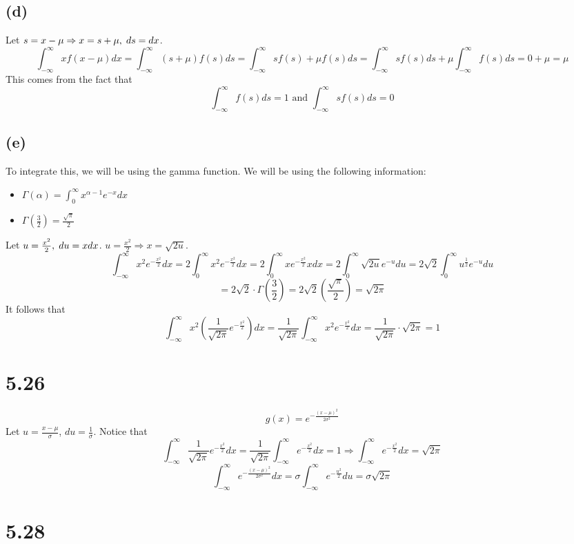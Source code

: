 \documentclass[11pt]{article}
\begin{document}
\subsection*{(d)}
Let $s=x-\mu\Rightarrow x=s+\mu,\hspace{1mm}ds=dx$.
\[\int_{-\infty}^{\infty}xf(x-\mu)dx=\int_{-\infty}^{\infty}(s+\mu)f(s)ds=\int_{-\infty}^{\infty}sf(s)+\mu f(s)ds=\int_{-\infty}^{\infty}sf(s)ds+\mu\int_{-\infty}^{\infty}f(s)ds=0+\mu=\mu\]
This comes from the fact that
\[\int_{-\infty}^{\infty}f(s)ds=1\text{ and }\int_{-\infty}^{\infty}sf(s)ds=0\]
\subsection*{(e)}
To integrate this, we will be using the gamma function. We will be using the following information:
\begin{itemize}
	\item $\Gamma(\alpha)=\int_0^{\infty}x^{\alpha-1}e^{-x}dx$
	\item $\Gamma(\frac{3}{2})=\frac{\sqrt{\pi}}{2}$
\end{itemize}
Let $u=\frac{x^2}{2},\hspace{1mm}du=xdx$. $u=\frac{x^2}{2}\Rightarrow x=\sqrt{2u}$.
\[\int_{-\infty}^{\infty}x^2e^{-\frac{x^2}{2}}dx=2\int_0^{\infty}x^2e^{-\frac{x^2}{2}}dx=2\int_0^{\infty}xe^{-\frac{x^2}{2}}xdx=2\int_0^{\infty}\sqrt{2u}e^{-u}du=2\sqrt{2}\int_0^{\infty}u^{\frac{1}{2}}e^{-u}du\]
\[=2\sqrt{2}\cdot\Gamma\left(\frac{3}{2}\right)=2\sqrt{2}\left(\frac{\sqrt{\pi}}{2}\right)=\sqrt{2\pi}\]
It follows that
\[\int_{-\infty}^{\infty}x^2\left(\frac{1}{\sqrt{2\pi}}e^{-\frac{x^2}{2}}\right)dx=\frac{1}{\sqrt{2\pi}}\int_{-\infty}^{\infty}x^2e^{-\frac{x^2}{2}}dx=\frac{1}{\sqrt{2\pi}}\cdot\sqrt{2\pi}=1\]
\clearpage
\section*{5.26}
\[g(x)=e^{-\frac{(x-\mu)^2}{2\sigma^2}}\]
Let $u=\frac{x-\mu}{\sigma}$, $du=\frac{1}{\sigma}$. Notice that
\[\int_{-\infty}^{\infty}\frac{1}{\sqrt{2\pi}}e^{-\frac{x^2}{2}}dx=\frac{1}{\sqrt{2\pi}}\int_{-\infty}^{\infty}e^{-\frac{x^2}{2}}dx=1\Rightarrow\int_{-\infty}^{\infty}e^{-\frac{x^2}{2}}dx=\sqrt{2\pi}\]
\[\int_{-\infty}^{\infty}e^{-\frac{(x-\mu)^2}{2\sigma^2}}dx=\sigma\int_{-\infty}^{\infty}e^{-\frac{u^2}{2}}du=\sigma\sqrt{2\pi}\]

\section*{5.28}
\end{document}
